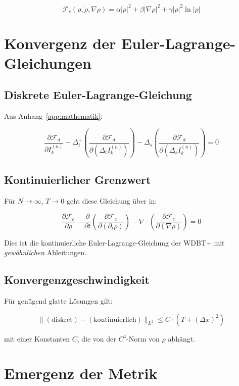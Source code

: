 \[
\mathcal{F}_c(\rho, \dot{\rho}, \nabla \rho) = \alpha|\dot{\rho}|^2 + \beta|\nabla \rho|^2 + \gamma |\rho|^2 \ln |\rho|
\]

\section{Konvergenz der Euler-Lagrange-Gleichungen}
\label{app:kontinuumslimes_euler_lagrange}

\subsection{Diskrete Euler-Lagrange-Gleichung}
\label{sub:kontinuumslimes_euler_diskret}

Aus Anhang~\ref{app:mathematik}:

\[
\frac{\partial \mathcal{F}_d}{\partial I_k^{(n)}} - \Delta_t^+ \left( \frac{\partial \mathcal{F}_d}{\partial (\Delta_t I_k^{(n)})} \right) - \Delta_s \left( \frac{\partial \mathcal{F}_d}{\partial (\Delta_s I_k^{(n)})} \right) = 0
\]

\subsection{Kontinuierlicher Grenzwert}
\label{sub:kontinuumslimes_euler_kont}

Für \( N \to \infty \), \( T \to 0 \) geht diese Gleichung über in:

\[
\frac{\partial \mathcal{F}_c}{\partial \rho} - \frac{\partial}{\partial t} \left( \frac{\partial \mathcal{F}_c}{\partial (\partial_t \rho)} \right) - \nabla \cdot \left( \frac{\partial \mathcal{F}_c}{\partial (\nabla \rho)} \right) = 0
\]

Dies ist die kontinuierliche Euler-Lagrange-Gleichung der WDBT+ mit \emph{gewöhnlichen} Ableitungen.

\subsection{Konvergenzgeschwindigkeit}
\label{sub:kontinuumslimes_geschwindigkeit}

Für genügend glatte Lösungen gilt:

\[
\| (\text{diskret}) - (\text{kontinuierlich}) \|_{L^2} \le C \cdot (T + (\Delta x)^2)
\]

mit einer Konstanten \( C \), die von der \( C^4 \)-Norm von \( \rho \) abhängt.

\section{Emergenz der Metrik}
\label{app:kontinuumslimes_metrik_emergenz}

